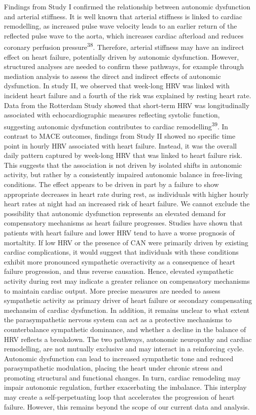\documentclass[
  a4paper,
  headsepline=true,
  open=any]{scrbook}
\begin{document}
Findings from Study I confirmed the relationship between autonomic
dysfunction and arterial stiffness. It is well known that arterial
stiffness is linked to cardiac remodelling, as increased pulse wave
velocity leads to an earlier return of the reflected pulse wave to the
aorta, which increases cardiac afterload and reduces coronary perfusion
pressure\textsuperscript{38}. Therefore, arterial stiffness may have an
indirect effect on heart failure, potentially driven by autonomic
dysfunction. However, structured analyses are needed to confirm these
pathways, for example through mediation analysis to assess the direct
and indirect effects of autonomic dysfunction. In study II, we observed
that week-long HRV was linked with incident heart failure and a fourth
of the risk was explained by resting heart rate. Data from the Rotterdam
Study showed that short-term HRV was longitudinally associated with
echocardiographic measures reflecting systolic function, suggesting
autonomic dysfunction contributes to cardiac
remodelling\textsuperscript{39}. In contrast to MACE outcomes, findings
from Study II showed no specific time point in hourly HRV associated
with heart failure. Instead, it was the overall daily pattern captured
by week-long HRV that was linked to heart failure risk. This suggests
that the association is not driven by isolated shifts in autonomic
activity, but rather by a consistently impaired autonomic balance in
free-living conditions. The effect appears to be driven in part by a
failure to show appropriate decreases in heart rate during rest, as
individuals with higher hourly heart rates at night had an increased
risk of heart failure. We cannot exclude the possibility that autonomic
dysfunction represents an elevated demand for compensatory mechanisms as
heart failure progresses. Studies have shown that patients with heart
failure and lower HRV tend to have a worse prognosis of mortaltity. If
low HRV or the presence of CAN were primarily driven by existing cardiac
complications, it would suggest that individuals with these conditions
exhibit more pronounced sympathetic overactivity as a consequence of
heart failure progression, and thus reverse causation. Hence, elevated
sympathetic activity during rest may indicate a greater reliance on
compensatory mechanisms to maintain cardiac output. More precise
measures are needed to assess sympathetic activity as primary driver of
heart failure or secondary compensating mechansim of cardiac
dysfunction. In addition, it remains unclear to what extent the
parasympathetic nervous system can act as a protective mechanisms to
counterbalance sympathetic dominance, and whether a decline in the
balance of HRV reflects a breakdown. The two pathways, autonomic
neuropathy and cardiac remodelling, are not mutually exclusive and may
interact in a reinforcing cycle. Autonomic dysfunction can lead to
increased sympathetic tone and reduced parasympathetic modulation,
placing the heart under chronic stress and promoting structural and
functional changes. In turn, cardiac remodeling may impair autonomic
regulation, further exacerbating the imbalance. This interplay may
create a self-perpetuating loop that accelerates the progression of
heart failure. However, this remains beyond the scope of our current
data and analysis.
\end{document}

